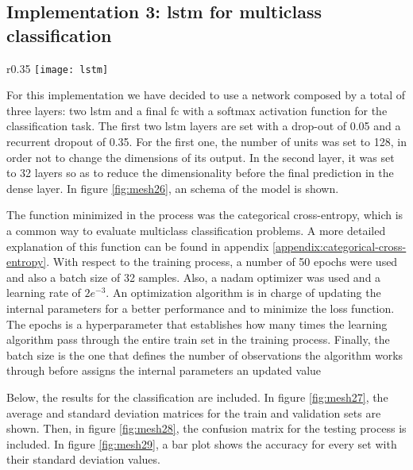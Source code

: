 	
\subsection{Implementation 3: \acrshort{lstm} for multiclass classification}

	\begin{wrapfigure}[12]{r}{0.35\textwidth}
		\centering
		\captionsetup{justification=centering}
		\texttt{[image: lstm]}
		\caption{LSTM architecture}
		\label{fig:mesh26}
	\end{wrapfigure}
	
	For this implementation we have decided to use a network composed by a total of three layers: two \acrshort{lstm} and a final \acrlong{fc} with a softmax activation function for the classification task. The first two \acrshort{lstm} layers are set with a drop-out of 0.05 and a recurrent dropout of 0.35. For the first one, the number of units was set to 128, in order not to change the dimensions of its output. In the second layer, it was set to 32 layers so as to reduce the dimensionality before the final prediction in the dense layer. In figure \ref{fig:mesh26}, an schema of the model is shown.
	
	The function minimized in the process was the categorical cross-entropy, which is a common way to evaluate multiclass classification problems. A more detailed explanation of this function can be found in appendix \ref{appendix:categorical-cross-entropy}. With respect to the training process, a number of 50 epochs were used and also a batch size of 32 samples. Also, a \acrshort{nadam} optimizer was used and a learning rate of $2e^{-3}$. An optimization algorithm is in charge of updating the internal parameters for a better performance and to minimize the loss function. The epochs is a hyperparameter that establishes how many times the learning algorithm pass through the entire train set in the training process. Finally, the batch size is the one that defines the number of observations the algorithm works through before assigns the internal parameters an updated value \cite{Browniee2018a}
	
	Below, the results for the classification are included. In figure \ref{fig:mesh27}, the average and standard deviation matrices for the train and validation sets are shown. Then, in figure \ref{fig:mesh28}, the confusion matrix for the testing process is included. In figure \ref{fig:mesh29}, a bar plot shows the accuracy for every set with their standard deviation values.
	
